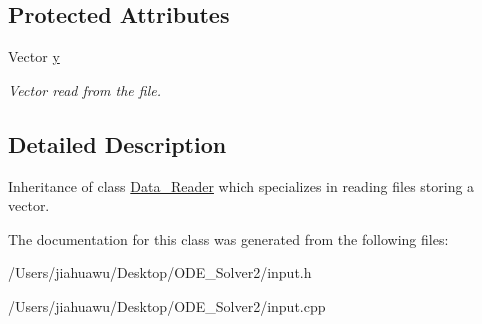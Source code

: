\subsection*{Protected Attributes}
\begin{DoxyCompactItemize}
\item 
\mbox{\label{class_vector___reader_a9b12a16c14096fd15f2c32f0afbb3b53}} 
Vector \mbox{\hyperlink{class_vector___reader_a9b12a16c14096fd15f2c32f0afbb3b53}{y}}
\begin{DoxyCompactList}\small\item\em Vector read from the file. \end{DoxyCompactList}\end{DoxyCompactItemize}


\subsection{Detailed Description}
Inheritance of class \mbox{\hyperlink{class_data___reader}{Data\+\_\+\+Reader}} which specializes in reading files storing a vector. 

The documentation for this class was generated from the following files\+:\begin{DoxyCompactItemize}
\item 
/\+Users/jiahuawu/\+Desktop/\+O\+D\+E\+\_\+\+Solver2/input.\+h\item 
/\+Users/jiahuawu/\+Desktop/\+O\+D\+E\+\_\+\+Solver2/input.\+cpp\end{DoxyCompactItemize}
